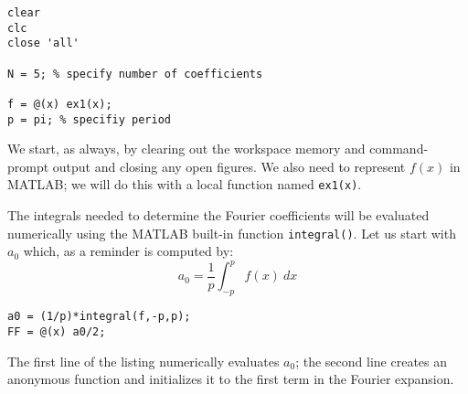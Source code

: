 \begin{lstlisting}[name=lec17-ex1]
clear
clc
close 'all'

N = 5; % specify number of coefficients

f = @(x) ex1(x); 
p = pi; % specifiy period
\end{lstlisting}
We start, as always, by clearing out the workspace memory and command-prompt output and closing any open figures.  We also need to represent $f(x)$ in MATLAB; we will do this with a local function named \lstinline{ex1(x)}.  

The integrals needed to determine the Fourier coefficients will be evaluated numerically using the MATLAB built-in function \lstinline{integral()}. Let us start with $a_0$ which, as a reminder is computed by:
\begin{equation*}
a_0 = \frac{1}{p}\int_{-p}^{p} f(x) \ dx
\end{equation*}

\begin{lstlisting}[name=lec17-ex1]
a0 = (1/p)*integral(f,-p,p);
FF = @(x) a0/2;
\end{lstlisting}
The first line of the listing numerically evaluates $a_0$; the second line creates an anonymous function and initializes it to the first term in the Fourier expansion.

